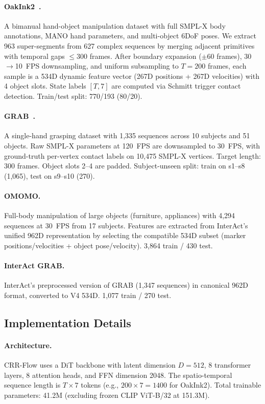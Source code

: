 \paragraph{OakInk2~\cite{zhan2024oakink2}.}
A bimanual hand-object manipulation dataset with full SMPL-X body annotations, MANO hand parameters, and multi-object 6DoF poses. We extract 963 super-segments from 627 complex sequences by merging adjacent primitives with temporal gaps $\leq 300$ frames. After boundary expansion ($\pm 60$ frames), 30$\rightarrow$10~FPS downsampling, and uniform subsampling to $T{=}200$ frames, each sample is a 534D dynamic feature vector (267D positions + 267D velocities) with 4 object slots. State labels $[T, 7]$ are computed via Schmitt trigger contact detection. Train/test split: 770/193 (80/20).

\paragraph{GRAB~\cite{taheri2020grab}.}
A single-hand grasping dataset with 1,335 sequences across 10 subjects and 51 objects. Raw SMPL-X parameters at 120~FPS are downsampled to 30~FPS, with ground-truth per-vertex contact labels on 10,475 SMPL-X vertices. Target length: 300 frames. Object slots 2--4 are padded. Subject-unseen split: train on s1--s8 (1,065), test on s9--s10 (270).

\paragraph{OMOMO.}
Full-body manipulation of large objects (furniture, appliances) with 4,294 sequences at 30~FPS from 17 subjects. Features are extracted from InterAct's~\cite{interact2024} unified 962D representation by selecting the compatible 534D subset (marker positions/velocities + object pose/velocity). 3,864 train / 430 test.

\paragraph{InterAct GRAB.}
InterAct's preprocessed version of GRAB (1,347 sequences) in canonical 962D format, converted to V4 534D. 1,077 train / 270 test.


\subsection{Implementation Details}
\label{sec:implementation}

\paragraph{Architecture.}
CRR-Flow uses a DiT backbone with latent dimension $D{=}512$, 8 transformer layers, 8 attention heads, and FFN dimension 2048. The spatio-temporal sequence length is $T {\times} 7$ tokens (e.g., $200 {\times} 7 = 1400$ for OakInk2). Total trainable parameters: 41.2M (excluding frozen CLIP ViT-B/32 at 151.3M).

